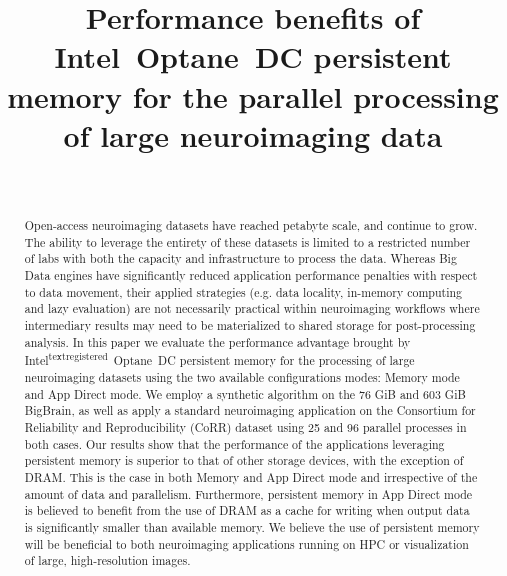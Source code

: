 \documentclass[conference]{IEEEtran}
\begin{document}
\title{Performance benefits of Intel\textsuperscript{\textregistered}~Optane\texttrademark~DC persistent memory for the parallel processing of large neuroimaging data}

\author{\\
}
\maketitle

\begin{abstract}
    Open-access neuroimaging datasets have reached petabyte scale, and continue to grow.
The ability to leverage the entirety of these datasets is limited to a restricted
number of labs with both the capacity and infrastructure to
process the data. Whereas Big Data engines have significantly
reduced application performance penalties with respect to data
movement, their applied strategies (e.g. data locality, in-memory computing and lazy evaluation)
are not necessarily practical
within neuroimaging workflows where intermediary results may
need to be materialized to shared storage for post-processing
analysis. In this paper we evaluate the performance advantage
brought by Intel\textsuperscript{textregistered}~Optane\texttrademark~DC persistent memory for the
processing of large neuroimaging datasets using the two available
configurations modes: Memory mode and App Direct mode. We
employ a synthetic algorithm on the 76 GiB and 603 GiB BigBrain, as well as apply a
standard neuroimaging application on the Consortium for Reliability
and Reproducibility (CoRR) dataset using 25 and 96 parallel
processes in both cases. Our results show that the performance of
the applications leveraging persistent memory is superior to that of other
storage devices, with the exception of DRAM. This is the case
in both Memory and App Direct mode and irrespective of the
amount of data and parallelism. Furthermore, persistent memory in App
Direct mode is believed to benefit from the use of DRAM as
a cache for writing when output data is significantly
smaller than available memory. We believe the use of persistent memory
will be beneficial to both neuroimaging applications running on
HPC or visualization of large, high-resolution images.
\end{abstract}
\end{document}
